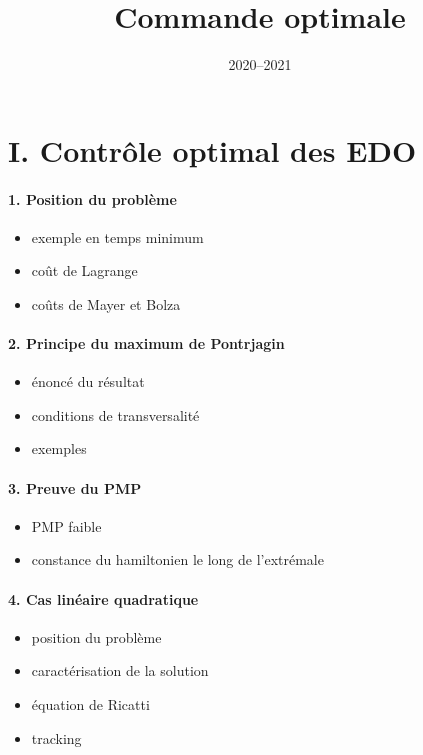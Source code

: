 \documentclass[11pt,a4paper]{article}
\title{Commande optimale}
\date{2020--2021}
\theoremstyle{plain}
\theoremstyle{definition}
\begin{document}
\maketitle

\section*{I. Contr\^ole optimal des EDO}

\paragraph{1. Position du probl\`eme}
\begin{itemize}
  \item exemple en temps minimum
  \item co\^ut de Lagrange
  \item co\^uts de Mayer et Bolza
\end{itemize}

\paragraph{2. Principe du maximum de Pontrjagin}
\begin{itemize}
  \item \'enonc\'e du r\'esultat
  \item conditions de transversalit\'e
  \item exemples
\end{itemize}

\paragraph{3. Preuve du PMP}
\begin{itemize}
  \item PMP faible
  \item constance du hamiltonien le long de l'extr\'emale
\end{itemize}

\paragraph{4. Cas lin\'eaire quadratique}

\begin{itemize}
  \item position du probl\`eme
  \item caract\'erisation de la solution
  \item \'equation de Ricatti
  \item tracking
\end{itemize}
\end{document}

